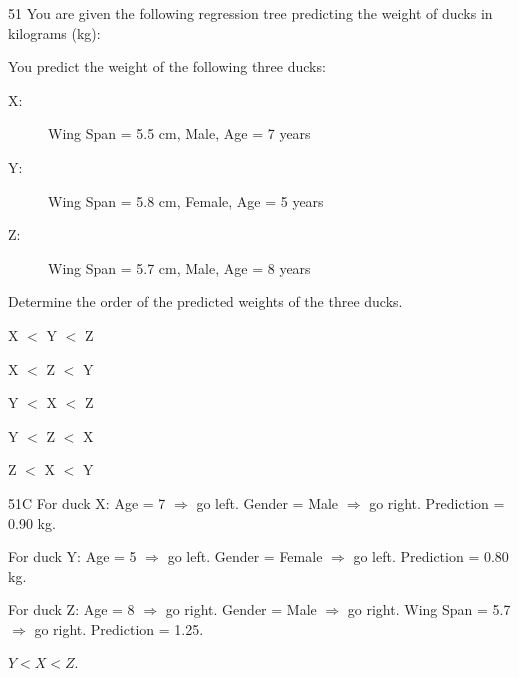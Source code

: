 \begin{question}{51}
You are given the following regression tree predicting the weight of ducks in kilograms (kg):


You predict the weight of the following three ducks:
\begin{description}
\item[X:] Wing Span = 5.5 cm, Male, Age = 7 years
\item[Y:] Wing Span = 5.8 cm, Female, Age = 5 years
\item[Z:] Wing Span = 5.7 cm, Male, Age = 8 years
\end{description}

Determine the order of the predicted weights of the three ducks.

\begin{choices}
\item X $<$ Y $<$ Z
\item X $<$ Z $<$ Y
\item Y $<$ X $<$ Z
\item Y $<$ Z $<$ X
\item Z $<$ X $<$ Y
\end{choices}
\end{question}
\begin{solution}{51}{C}
For duck X: Age = 7 $\Rightarrow$ go left. Gender = Male $\Rightarrow$ go right. Prediction = 0.90 kg.

For duck Y: Age = 5 $\Rightarrow$ go left. Gender = Female $\Rightarrow$ go left. Prediction = 0.80 kg.

For duck Z: Age = 8 $\Rightarrow$ go right. Gender = Male $\Rightarrow$ go right. Wing Span = 5.7 $\Rightarrow$ go right.
Prediction = 1.25.

$Y < X < Z$.
\end{solution}

